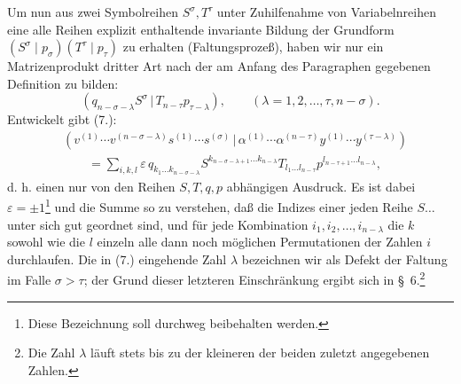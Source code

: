 \documentclass[11pt]{article}
\providecommand{\pair}[2]{(#1\,|\,#2)}
\providecommand{\eps}{\varepsilon}
\begin{document}
Um nun aus zwei Symbolreihen $S^\sigma,T^\tau$ unter Zuhilfenahme von Variabelnreihen eine alle Reihen explizit enthaltende invariante Bildung der Grundform $(S^\sigma\mid p_\sigma)(T^\tau\mid p_\tau)$ zu erhalten (Faltungsprozeß), haben wir nur ein Matrizenprodukt dritter Art nach der am Anfang des Paragraphen gegebenen Definition zu bilden:
\begin{equation}
 \pair{q_{n-\sigma-\lambda}S^\sigma}{T_{n-\tau}p_{\tau-\lambda}},
 \qquad (\lambda=1,2,\ldots,\tau,n-\sigma).
\tag{7}
\end{equation}
Entwickelt gibt (7.):
\begin{equation}
\begin{aligned}
&\pair{v^{(1)}\cdots v^{(n-\sigma-\lambda)}s^{(1)}\cdots s^{(\sigma)}}
       {\alpha^{(1)}\cdots\alpha^{(n-\tau)}y^{(1)}\cdots y^{(\tau-\lambda)}} \\
&\qquad =\sum_{i,k,l}\eps\,q_{k_1\ldots k_{n-\sigma-\lambda}}
 S^{k_{n-\sigma-\lambda+1}\ldots k_{n-\lambda}}
 T_{l_1\ldots l_{n-\tau}}
 p^{l_{n-\tau+1}\ldots l_{n-\lambda}},
\end{aligned}
\tag{8}
\end{equation}
d. h. einen nur von den Reihen $S,T,q,p$ abhängigen Ausdruck. Es ist dabei $\eps=\pm1$\footnote{Diese Bezeichnung soll durchweg beibehalten werden.} und die Summe so zu verstehen, daß die Indizes einer jeden Reihe $S\ldots$ unter sich gut geordnet sind, und für jede Kombination $i_1,i_2,\ldots,i_{n-\lambda}$ die $k$ sowohl wie die $l$ einzeln alle dann noch möglichen Permutationen der Zahlen $i$ durchlaufen. Die in (7.) eingehende Zahl $\lambda$ bezeichnen wir als Defekt der Faltung im Falle $\sigma>\tau$; der Grund dieser letzteren Einschränkung ergibt sich in \S\ 6.\footnote{Die Zahl $\lambda$ läuft stets bis zu der kleineren der beiden zuletzt angegebenen Zahlen.}
\end{document}
